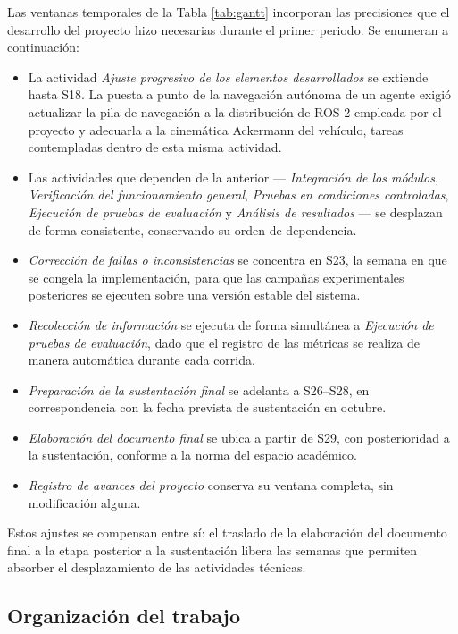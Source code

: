 \documentclass[12pt,letterpaper]{article}
\begin{document}
Las ventanas temporales de la Tabla \ref{tab:gantt} incorporan las precisiones que el desarrollo del proyecto hizo necesarias durante el primer periodo. Se enumeran a continuación:

\begin{itemize}
    \item La actividad \textit{Ajuste progresivo de los elementos desarrollados} se extiende hasta S18. La puesta a punto de la navegación autónoma de un agente exigió actualizar la pila de navegación a la distribución de ROS 2 empleada por el proyecto y adecuarla a la cinemática Ackermann del vehículo, tareas contempladas dentro de esta misma actividad.
    \item Las actividades que dependen de la anterior --- \textit{Integración de los módulos}, \textit{Verificación del funcionamiento general}, \textit{Pruebas en condiciones controladas}, \textit{Ejecución de pruebas de evaluación} y \textit{Análisis de resultados} --- se desplazan de forma consistente, conservando su orden de dependencia.
    \item \textit{Corrección de fallas o inconsistencias} se concentra en S23, la semana en que se congela la implementación, para que las campañas experimentales posteriores se ejecuten sobre una versión estable del sistema.
    \item \textit{Recolección de información} se ejecuta de forma simultánea a \textit{Ejecución de pruebas de evaluación}, dado que el registro de las métricas se realiza de manera automática durante cada corrida.
    \item \textit{Preparación de la sustentación final} se adelanta a S26--S28, en correspondencia con la fecha prevista de sustentación en octubre.
    \item \textit{Elaboración del documento final} se ubica a partir de S29, con posterioridad a la sustentación, conforme a la norma del espacio académico.
    \item \textit{Registro de avances del proyecto} conserva su ventana completa, sin modificación alguna.
\end{itemize}

Estos ajustes se compensan entre sí: el traslado de la elaboración del documento final a la etapa posterior a la sustentación libera las semanas que permiten absorber el desplazamiento de las actividades técnicas.

\subsection{Organización del trabajo}
\end{document}
